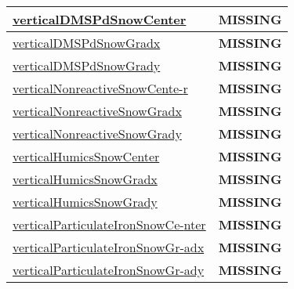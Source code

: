 {\begin{center}
\begin{longtable}{| p{2.0in} | p{4.0in} |}
    \hline
    \hyperref[subsec:var_sec_tracer_reconstruction_verticalDMSPdSnowCenter]{verticalDMSPdSnowCenter} & {\bf \color{red} MISSING} \\
    \hline
    \hyperref[subsec:var_sec_tracer_reconstruction_verticalDMSPdSnowGradx]{verticalDMSPdSnowGradx} & {\bf \color{red} MISSING} \\
    \hline
    \hyperref[subsec:var_sec_tracer_reconstruction_verticalDMSPdSnowGrady]{verticalDMSPdSnowGrady} & {\bf \color{red} MISSING} \\
    \hline
    \hyperref[subsec:var_sec_tracer_reconstruction_verticalNonreactiveSnowCenter]{verticalNonreactiveSnowCente-}\hyperref[subsec:var_sec_tracer_reconstruction_verticalNonreactiveSnowCenter]{r  }& {\bf \color{red} MISSING} \\
    \hline
    \hyperref[subsec:var_sec_tracer_reconstruction_verticalNonreactiveSnowGradx]{verticalNonreactiveSnowGradx} & {\bf \color{red} MISSING} \\
    \hline
    \hyperref[subsec:var_sec_tracer_reconstruction_verticalNonreactiveSnowGrady]{verticalNonreactiveSnowGrady} & {\bf \color{red} MISSING} \\
    \hline
    \hyperref[subsec:var_sec_tracer_reconstruction_verticalHumicsSnowCenter]{verticalHumicsSnowCenter} & {\bf \color{red} MISSING} \\
    \hline
    \hyperref[subsec:var_sec_tracer_reconstruction_verticalHumicsSnowGradx]{verticalHumicsSnowGradx} & {\bf \color{red} MISSING} \\
    \hline
    \hyperref[subsec:var_sec_tracer_reconstruction_verticalHumicsSnowGrady]{verticalHumicsSnowGrady} & {\bf \color{red} MISSING} \\
    \hline
    \hyperref[subsec:var_sec_tracer_reconstruction_verticalParticulateIronSnowCenter]{verticalParticulateIronSnowCe-}\hyperref[subsec:var_sec_tracer_reconstruction_verticalParticulateIronSnowCenter]{nter  }& {\bf \color{red} MISSING} \\
    \hline
    \hyperref[subsec:var_sec_tracer_reconstruction_verticalParticulateIronSnowGradx]{verticalParticulateIronSnowGr-}\hyperref[subsec:var_sec_tracer_reconstruction_verticalParticulateIronSnowGradx]{adx  }& {\bf \color{red} MISSING} \\
    \hline
    \hyperref[subsec:var_sec_tracer_reconstruction_verticalParticulateIronSnowGrady]{verticalParticulateIronSnowGr-}\hyperref[subsec:var_sec_tracer_reconstruction_verticalParticulateIronSnowGrady]{ady  }& {\bf \color{red} MISSING} \\

\end{longtable}
\end{center}}
